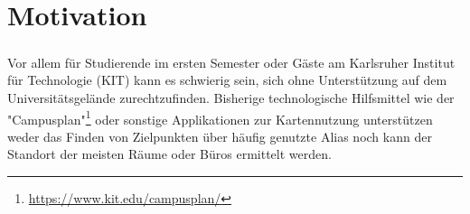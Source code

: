 \chapter{Motivation}

\paragraph{}
Vor allem für Studierende im ersten Semester oder Gäste am Karlsruher Institut für Technologie (KIT) 
kann es schwierig sein, sich ohne Unterstützung auf dem Universitätsgelände zurechtzufinden. Bisherige 
technologische Hilfsmittel wie der "Campusplan"\footnote{\href{https://www.kit.edu/campusplan/}{https://www.kit.edu/campusplan/}} oder sonstige Applikationen
zur Kartennutzung unterstützen weder das Finden von Zielpunkten über häufig genutzte \Gls{Alias} noch kann der Standort der meisten Räume oder Büros ermittelt werden.
